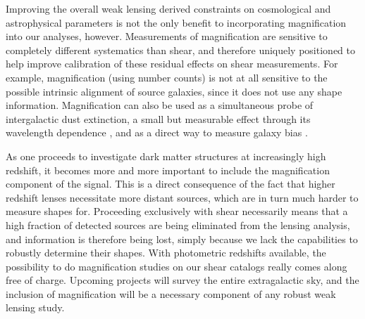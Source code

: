 Improving the overall weak lensing derived constraints on cosmological and astrophysical parameters is not the only benefit to incorporating magnification into our analyses, however. Measurements of magnification are sensitive to completely different systematics than shear, and therefore uniquely positioned to help improve calibration of these residual effects on shear measurements.  For example, magnification (using number counts) is not at all sensitive to the possible intrinsic alignment of source galaxies, since it does not use any shape information. Magnification can also be used as a simultaneous probe of intergalactic dust extinction, a small but measurable effect through its wavelength dependence \citep{Menard10}, and as a direct way to measure galaxy bias \citep{Waerbeke10}.

As one proceeds to investigate dark matter structures at increasingly high redshift, it becomes more and more important to include the magnification component of the signal.  This is a direct consequence of the fact that higher redshift lenses necessitate more distant sources, which are in turn much harder to measure shapes for. Proceeding exclusively with shear necessarily means that a high fraction of detected sources are being eliminated from the lensing analysis, and information is therefore being lost, simply because we lack the capabilities to robustly determine their shapes.  With photometric redshifts available, the possibility to do magnification studies on our shear catalogs really comes along free of charge. Upcoming projects will survey the entire extragalactic sky, and the inclusion of magnification will be a necessary component of any robust weak lensing study.
